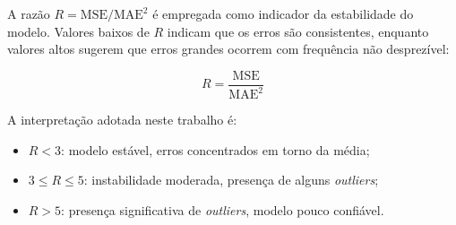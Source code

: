 A razão \(R = \text{MSE} / \text{MAE}^2\) é empregada como indicador da estabilidade do modelo. Valores baixos de \(R\) indicam que os erros são consistentes, enquanto valores altos sugerem que erros grandes ocorrem com frequência não desprezível:

\begin{equation}
R = \frac{\text{MSE}}{\text{MAE}^2}
\label{eq:estabilidade}
\end{equation}

A interpretação adotada neste trabalho é:
\begin{itemize}
    \item \(R < 3\): modelo estável, erros concentrados em torno da média;
    \item \(3 \leq R \leq 5\): instabilidade moderada, presença de alguns \textit{outliers};
    \item \(R > 5\): presença significativa de \textit{outliers}, modelo pouco confiável.
\end{itemize}